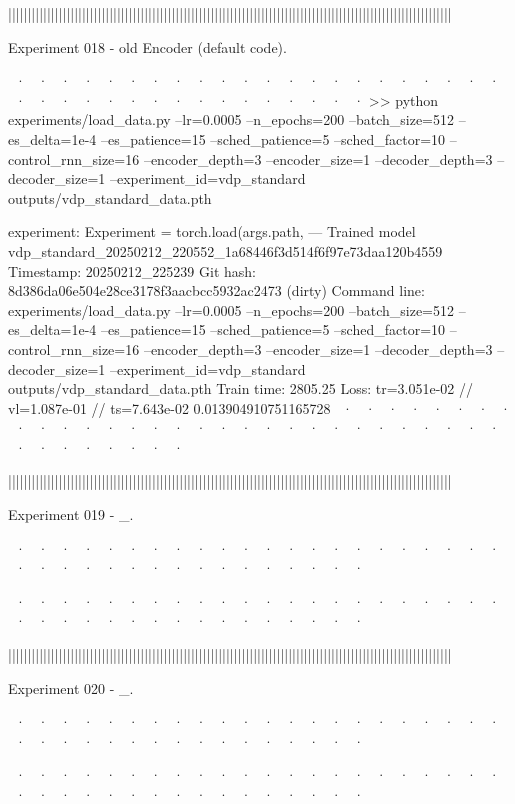 ||||||||||||||||||||||||||||||||||||||||||||||||||||||||||||||||||||||||||||||||||||||||||||||||||||||||||||||||||


Experiment 018 - old Encoder (default code). 


~· ~· ~· ~· ~· ~· ~· ~· ~· ~· ~· ~· ~· ~· ~· ~· ~· ~· ~· ~· ~· ~· ~· ~· ~· ~· ~· ~· ~· ~· ~· ~· ~· ~· ~· ~· ~· ~· 
>> python experiments/load_data.py  --lr=0.0005 --n_epochs=200 --batch_size=512 --es_delta=1e-4 --es_patience=15 --sched_patience=5 --sched_factor=10 --control_rnn_size=16 --encoder_depth=3 --encoder_size=1 --decoder_depth=3 --decoder_size=1 --experiment_id=vdp_standard  outputs/vdp_standard_data.pth 

experiment: Experiment = torch.load(args.path,
--- Trained model   vdp_standard_20250212_220552_1a68446f3d514f6f97e73daa120b4559
Timestamp:      20250212_225239
Git hash:       8d386da06e504e28ce3178f3aacbcc5932ac2473 (dirty)
Command line:   experiments/load_data.py --lr=0.0005 --n_epochs=200 --batch_size=512 --es_delta=1e-4 --es_patience=15 --sched_patience=5 --sched_factor=10 --control_rnn_size=16 --encoder_depth=3 --encoder_size=1 --decoder_depth=3 --decoder_size=1 --experiment_id=vdp_standard outputs/vdp_standard_data.pth
Train time:     2805.25
Loss:           tr=3.051e-02 // vl=1.087e-01 // ts=7.643e-02
0.013904910751165728
~· ~· ~· ~· ~· ~· ~· ~· ~· ~· ~· ~· ~· ~· ~· ~· ~· ~· ~· ~· ~· ~· ~· ~· ~· ~· ~· ~· ~· ~· ~· ~· ~· ~· ~· ~· ~· ~· 



||||||||||||||||||||||||||||||||||||||||||||||||||||||||||||||||||||||||||||||||||||||||||||||||||||||||||||||||||


Experiment 019 - _. 


~· ~· ~· ~· ~· ~· ~· ~· ~· ~· ~· ~· ~· ~· ~· ~· ~· ~· ~· ~· ~· ~· ~· ~· ~· ~· ~· ~· ~· ~· ~· ~· ~· ~· ~· ~· ~· ~· 

~· ~· ~· ~· ~· ~· ~· ~· ~· ~· ~· ~· ~· ~· ~· ~· ~· ~· ~· ~· ~· ~· ~· ~· ~· ~· ~· ~· ~· ~· ~· ~· ~· ~· ~· ~· ~· ~· 



||||||||||||||||||||||||||||||||||||||||||||||||||||||||||||||||||||||||||||||||||||||||||||||||||||||||||||||||||


Experiment 020 - _. 


~· ~· ~· ~· ~· ~· ~· ~· ~· ~· ~· ~· ~· ~· ~· ~· ~· ~· ~· ~· ~· ~· ~· ~· ~· ~· ~· ~· ~· ~· ~· ~· ~· ~· ~· ~· ~· ~· 

~· ~· ~· ~· ~· ~· ~· ~· ~· ~· ~· ~· ~· ~· ~· ~· ~· ~· ~· ~· ~· ~· ~· ~· ~· ~· ~· ~· ~· ~· ~· ~· ~· ~· ~· ~· ~· ~· 



